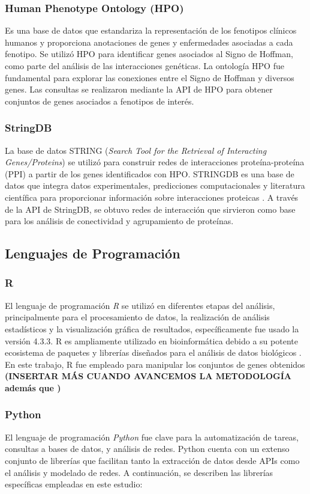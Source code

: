 \subsubsection{Human Phenotype Ontology (HPO)}
Es una base de datos que estandariza la representación de los fenotipos clínicos humanos y proporciona anotaciones de genes y enfermedades asociadas a cada fenotipo\cite{gargano2024}. Se utilizó HPO para identificar genes asociados al Signo de Hoffman, como parte del análisis de las interacciones genéticas. La ontología HPO fue fundamental para explorar las conexiones entre el Signo de Hoffman y diversos genes. Las consultas se realizaron mediante la API de HPO para obtener conjuntos de genes asociados a fenotipos de interés.

\subsubsection{StringDB}
La base de datos STRING (\textit{Search Tool for the Retrieval of Interacting Genes/Proteins}) se utilizó para construir redes de interacciones proteína-proteína (PPI) a partir de los genes identificados con HPO. STRINGDB es una base de datos que integra datos experimentales, predicciones computacionales y literatura científica para proporcionar información sobre interacciones proteicas \cite{szklarczyk2019}. A través de la API de StringDB, se obtuvo redes de interacción que sirvieron como base para los análisis de conectividad y agrupamiento de proteínas.

\subsection{Lenguajes de Programación}

\subsubsection{R}
El lenguaje de programación \textit{R} se utilizó en diferentes etapas del análisis, principalmente para el procesamiento de datos, la realización de análisis estadísticos y la visualización gráfica de resultados, específicamente fue usado la versión 4.3.3. R es ampliamente utilizado en bioinformática debido a su potente ecosistema de paquetes y librerías diseñados para el análisis de datos biológicos \cite{chan2018}. En este trabajo, R fue empleado para manipular los conjuntos de genes obtenidos \textbf{(INSERTAR MÁS CUANDO AVANCEMOS LA METODOLOGÍA además que )}

\subsubsection{Python}
El lenguaje de programación \textit{Python} fue clave para la automatización de tareas, consultas a bases de datos, y análisis de redes. Python cuenta con un extenso conjunto de librerías que facilitan tanto la extracción de datos desde APIs como el análisis y modelado de redes. A continuación, se describen las librerías específicas empleadas en este estudio:

